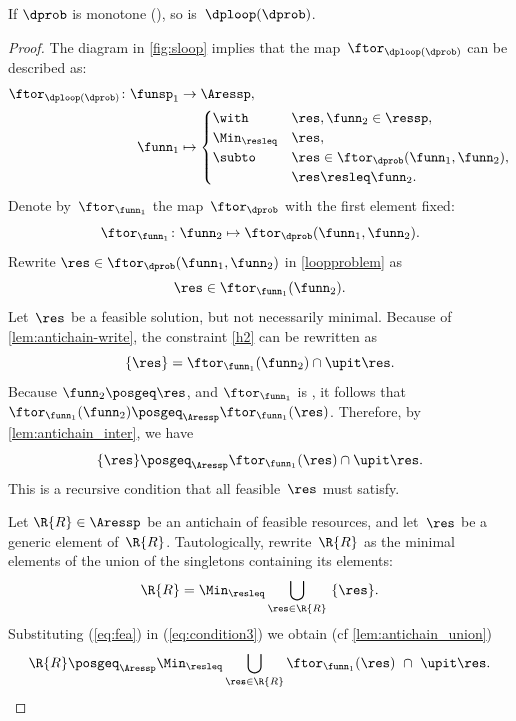 \begin{proposition}
\label{pro:loop-continuous}If $\dprob$ is monotone (),
so is~$\dploop(\dprob)$.
\end{proposition}
\begin{proof}
The diagram in \cref{fig:sloop} implies that the map~$\ftor_{\dploop(\dprob)}$
can be described as:
\begin{align}
\ftor_{\dploop(\dprob)}\colon\funsp_{1} & \rightarrow\Aressp,\label{eq:loopproblem}\\
\funn_{1} & \mapsto\begin{cases}
\with & \res,\funn_{2}\in\ressp,\\
\Min_{\resleq} & \res,\\
\subto & \res\in\ftor_{\dprob}(\funn_{1},\funn_{2}),\\
 & \res\resleq\funn_{2}.
\end{cases}
\end{align}
Denote by~$\ftor_{\funn_{1}}$ the map~$\ftor_{\dprob}$ with the
first element fixed:
\[
\ftor_{\funn_{1}}\colon\funn_{2}\mapsto\ftor_{\dprob}(\funn_{1},\funn_{2}).
\]
Rewrite $\res\in\ftor_{\dprob}(\funn_{1},\funn_{2})$ in \eqref{loopproblem}
as
\begin{equation}
\res\in\ftor_{\funn_{1}}(\funn_{2}).\label{eq:h2}
\end{equation}
Let~$\res$ be a feasible solution, but not necessarily minimal.
Because of \cref{lem:antichain-write}, the constraint \eqref{h2} can
be rewritten as 
\begin{equation}
\{\res\}=\ftor_{\funn_{1}}(\funn_{2})\cap\upit\res.\label{eq:h3}
\end{equation}
Because $\funn_{2}\posgeq\res$, and $\ftor_{\funn_{1}}$ is \scottcontinuous,
it follows that~$\ftor_{\funn_{1}}(\funn_{2})\posgeq_{\Aressp}\ftor_{\funn_{1}}(\res)$.
Therefore, by \cref{lem:antichain_inter}, we have
\begin{equation}
\{\res\}\posgeq_{\Aressp}\ftor_{\funn_{1}}(\res)\cap\upit\res.\label{eq:fea}
\end{equation}
This is a recursive condition that all feasible~$\res$ must satisfy.

Let $\R{R}\in\Aressp$ be an antichain of feasible resources, and
let~$\res$ be a generic element of~$\R{R}$. Tautologically, rewrite~$\R{R}$
as the minimal elements of the union of the singletons containing
its elements: 
\begin{equation}
\R{R}=\Min_{\resleq}\bigcup_{\res\in\R{R}}\ \{\res\}.\label{eq:condition3}
\end{equation}
Substituting (\ref{eq:fea}) in (\ref{eq:condition3}) we obtain (cf
\cref{lem:antichain_union})
\begin{equation}
\R{R}\posgeq_{\Aressp}\Min_{\resleq}\bigcup_{\res\in\R{R}}\ftor_{\funn_{1}}(\res)\ \cap\ \upit\res.\label{eq:recursive}
\end{equation}


\end{proof}
